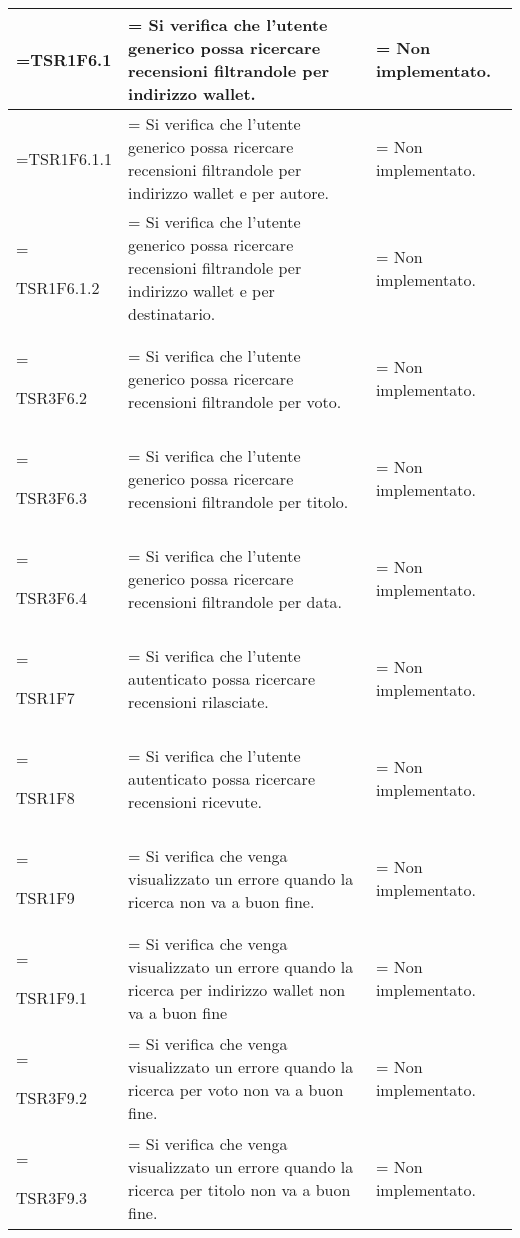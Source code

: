 \begin{xltabular}{\textwidth} {
        >{\hsize\linewidth=\hsize}X
        >{\hsize\linewidth=\hsize}X
        >{\hsize\linewidth=\hsize}X
    }
    TSR1F6.1&
    Si verifica che l'utente generico possa ricercare recensioni filtrandole per indirizzo wallet.&
    Non implementato.
    \\ \hline
    
    TSR1F6.1.1&
    Si verifica che l'utente generico possa ricercare recensioni filtrandole per indirizzo wallet e per autore.&
    Non implementato.
    \\ \hline
    
    TSR1F6.1.2&
    Si verifica che l'utente generico possa ricercare recensioni filtrandole per indirizzo wallet e per destinatario.&
    Non implementato.
    \\ \hline

    TSR3F6.2&
    Si verifica che l'utente generico possa ricercare recensioni filtrandole per voto.&
    Non implementato.
    \\ \hline
    
    TSR3F6.3&
    Si verifica che l'utente generico possa ricercare recensioni filtrandole per titolo.&
    Non implementato.
    \\ \hline

    TSR3F6.4&
    Si verifica che l'utente generico possa ricercare recensioni filtrandole per data.&
    Non implementato.
    \\ \hline

    TSR1F7&
    Si verifica che l'utente autenticato possa ricercare recensioni rilasciate. &
    Non implementato.
    \\ \hline

    TSR1F8&
    Si verifica che l'utente autenticato possa ricercare recensioni ricevute. &
    Non implementato.
    \\ \hline
    
    TSR1F9&
    Si verifica che venga visualizzato un errore quando la ricerca non va a buon fine. &
    Non implementato.
    \\ \hline

    TSR1F9.1&
    Si verifica che venga visualizzato un errore quando la ricerca per indirizzo wallet non va a buon fine &
    Non implementato.
    \\ \hline
    
    TSR3F9.2&
    Si verifica che venga visualizzato un errore quando la ricerca per voto non va a buon fine. &
    Non implementato.
    \\ \hline
    
    TSR3F9.3&
    Si verifica che venga visualizzato un errore quando la ricerca per titolo non va a buon fine. &
    Non implementato.
    \\ \hline


\end{xltabular}
